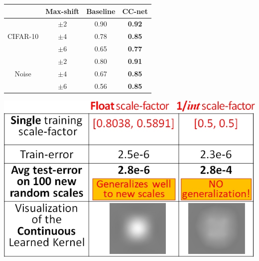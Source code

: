 \begin{minipage}{1\textwidth}
\begin{minipage}[b]{.4\textwidth}
\centering
    \begin{tabular}{|c||c|c|c|}
    \hline
                                    & Max-shift   &{Baseline}       & {CC-net}           \\ \hline\hline
    \multirow{3}{*}{CIFAR-10}  & $\pm 2$       & 0.90            & \textbf{0.92}          \\ \cline{2-4}                  
                                   & $\pm 4$       & 0.78         & \textbf{0.85}          \\ \cline{2-4}
                                    & $\pm 6$       & 0.65        & \textbf{0.77}          \\ \hline
    \multirow{3}{*}{Noise}          & $\pm 2$       & 0.80        & \textbf{0.91}          \\ \cline{2-4}
                                   & $\pm 4$       & 0.67         & \textbf{0.85}          \\ \cline{2-4}
                                  & $\pm 6$       & 0.56          & \textbf{0.85}          \\ \hline          

\end{tabular}  %
\label{table:equivar}
\end{minipage}%
\hspace{3cm}
  \begin{minipage}[b]{0.35\textwidth}
  \includegraphics[width=1.1\textwidth]{figs/fig_generalize_Michal.jpg}
    \label{fig:generalize}
\end{minipage}

\end{minipage}


